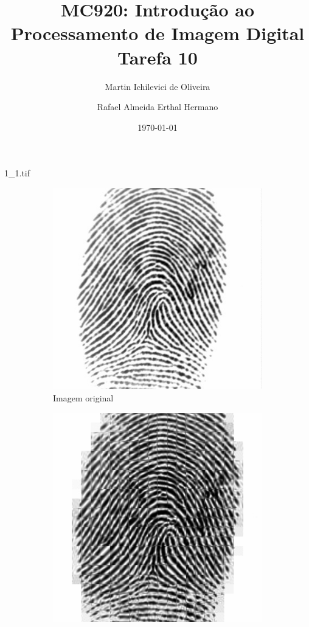 \documentclass{beamer}
\title{MC920: Introdução ao Processamento de Imagem Digital\\Tarefa 10}
\author{Martin Ichilevici de Oliveira \and Rafael Almeida Erthal Hermano}
\date{\today}
\begin{document}
\maketitle

    \begin{frame}{1\_1.tif}
        \begin{figure}
            \centering
            \begin{subfigure}[!ht]{0.32\textwidth}
                \includegraphics[width=\columnwidth]{Fingerprints/1_1.jpg}
                \caption{Imagem original}
            \end{subfigure}
            \begin{subfigure}[!ht]{0.32\textwidth}
                \includegraphics[width=\columnwidth]{Fingerprints/1_1_intermediate.jpg}

\end{subfigure}
\end{figure}
\end{frame}
\end{document}

